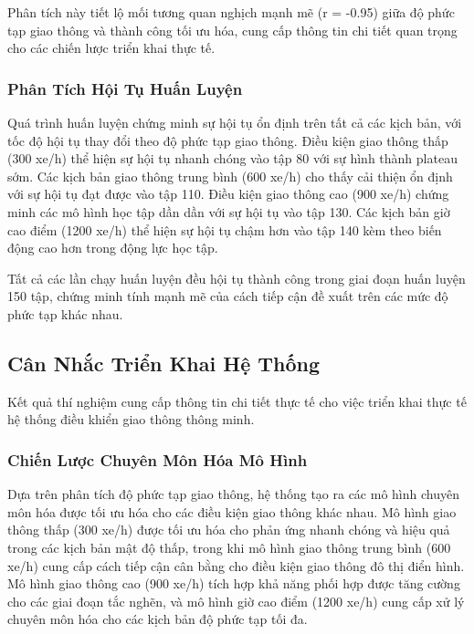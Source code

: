 Phân tích này tiết lộ mối tương quan nghịch mạnh mẽ (r = -0.95) giữa độ phức tạp giao thông và thành công 
tối ưu hóa, cung cấp thông tin chi tiết quan trọng cho các chiến lược triển khai thực tế.

\subsubsection{Phân Tích Hội Tụ Huấn Luyện}

Quá trình huấn luyện chứng minh sự hội tụ ổn định trên tất cả các kịch bản, với tốc độ hội tụ thay đổi 
theo độ phức tạp giao thông. Điều kiện giao thông thấp (300 xe/h) thể hiện sự hội tụ nhanh chóng vào tập 80 
với sự hình thành plateau sớm. Các kịch bản giao thông trung bình (600 xe/h) cho thấy cải thiện ổn định 
với sự hội tụ đạt được vào tập 110. Điều kiện giao thông cao (900 xe/h) chứng minh các mô hình học tập dần dần 
với sự hội tụ vào tập 130. Các kịch bản giờ cao điểm (1200 xe/h) thể hiện sự hội tụ chậm hơn vào tập 140 
kèm theo biến động cao hơn trong động lực học tập.

Tất cả các lần chạy huấn luyện đều hội tụ thành công trong giai đoạn huấn luyện 150 tập, chứng minh tính mạnh mẽ 
của cách tiếp cận đề xuất trên các mức độ phức tạp khác nhau.

\subsection{Cân Nhắc Triển Khai Hệ Thống}\label{subsec2b-5}

Kết quả thí nghiệm cung cấp thông tin chi tiết thực tế cho việc triển khai thực tế hệ thống điều khiển 
giao thông thông minh.

\subsubsection{Chiến Lược Chuyên Môn Hóa Mô Hình}

Dựa trên phân tích độ phức tạp giao thông, hệ thống tạo ra các mô hình chuyên môn hóa được tối ưu hóa 
cho các điều kiện giao thông khác nhau. Mô hình giao thông thấp (300 xe/h) được tối ưu hóa cho phản ứng 
nhanh chóng và hiệu quả trong các kịch bản mật độ thấp, trong khi mô hình giao thông trung bình (600 xe/h) 
cung cấp cách tiếp cận cân bằng cho điều kiện giao thông đô thị điển hình. Mô hình giao thông cao (900 xe/h) 
tích hợp khả năng phối hợp được tăng cường cho các giai đoạn tắc nghẽn, và mô hình giờ cao điểm (1200 xe/h) 
cung cấp xử lý chuyên môn hóa cho các kịch bản độ phức tạp tối đa.

